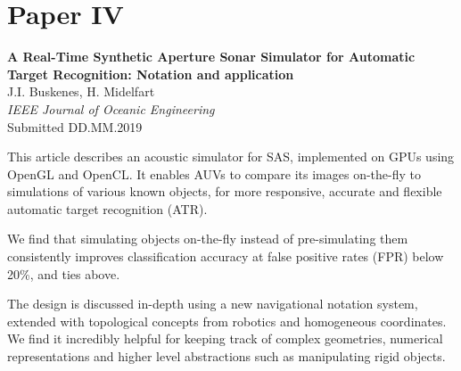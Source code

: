 \section{Paper IV}\label{sec:paperIV} %
\textbf{A Real-Time Synthetic Aperture Sonar Simulator for Automatic Target Recognition: Notation and application}\\
J.I. Buskenes, H. Midelfart\\
\textit{IEEE Journal of Oceanic Engineering}\\
Submitted DD.MM.2019%

This article describes an acoustic simulator for SAS, implemented on GPUs using OpenGL and OpenCL. It enables AUVs to compare its images on-the-fly to simulations of various known objects, for more responsive, accurate and flexible automatic target recognition (ATR).

We find that simulating objects on-the-fly instead of pre-simulating them consistently improves classification accuracy at false positive rates (FPR) below 20\%, and ties above. 

The design is discussed in-depth using a new navigational notation system, extended with topological concepts from robotics and homogeneous coordinates. We find it incredibly helpful for keeping track of complex geometries, numerical representations and higher level abstractions such as manipulating rigid objects. 




%
%
%





